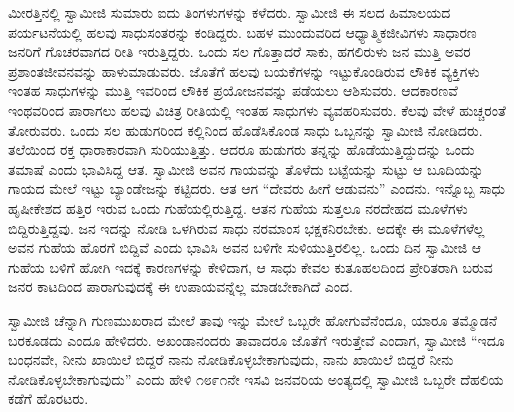 ಮೀರತ್ತಿನಲ್ಲಿ ಸ್ವಾಮೀಜಿ ಸುಮಾರು ಐದು ತಿಂಗಳುಗಳನ್ನು ಕಳೆದರು. ಸ್ವಾಮೀಜಿ ಈ ಸಲದ ಹಿಮಾಲಯದ ಪರ್ಯಟನೆಯಲ್ಲಿ ಹಲವು ಸಾಧುಸಂತರನ್ನು ಕಂಡಿದ್ದರು. ಬಹಳ ಮುಂದುವರಿದ ಆಧ್ಯಾತ್ಮಿಕಜೀವಿಗಳು ಸಾಧಾರಣ ಜನರಿಗೆ ಗೊಚರವಾಗದ ರೀತಿ ಇರುತ್ತಿದ್ದರು. ಒಂದು ಸಲ ಗೊತ್ತಾದರೆ ಸಾಕು, ಹಗಲಿರುಳು ಜನ ಮುತ್ತಿ ಅವರ ಪ್ರಶಾಂತಜೀವನವನ್ನು ಹಾಳುಮಾಡುವರು. ಜೊತೆಗೆ ಹಲವು ಬಯಕೆಗಳನ್ನು ಇಟ್ಟುಕೊಂಡಿರುವ ಲೌಕಿಕ ವ್ಯಕ್ತಿಗಳು ಇಂತಹ ಸಾಧುಗಳನ್ನು ಮುತ್ತಿ ಇವರಿಂದ ಲೌಕಿಕ ಪ್ರಯೋಜನವನ್ನು ಪಡೆಯಲು ಆಶಿಸುವರು. ಆದಕಾರಣವೆ ಇಂಥವರಿಂದ ಪಾರಾಗಲು ಹಲವು ವಿಚಿತ್ರ ರೀತಿಯಲ್ಲಿ ಇಂತಹ ಸಾಧುಗಳು ವ್ಯವಹರಿಸುವರು. ಕೆಲವು ವೇಳೆ ಹುಚ್ಚರಂತೆ ತೋರುವರು. ಒಂದು ಸಲ ಹುಡುಗರಿಂದ ಕಲ್ಲಿನಿಂದ ಹೊಡೆಸಿಕೊಂಡ ಸಾಧು ಒಬ್ಬನನ್ನು ಸ್ವಾಮೀಜಿ ನೋಡಿದರು. ತಲೆಯಿಂದ ರಕ್ತ ಧಾರಾಕಾರವಾಗಿ ಸುರಿಯುತ್ತಿತ್ತು. ಆದರೂ ಹುಡುಗರು ತನ್ನನ್ನು ಹೊಡೆಯುತ್ತಿದ್ದುದನ್ನು ಒಂದು ತಮಾಷೆ ಎಂದು ಭಾವಿಸಿದ್ದ ಆತ. ಸ್ವಾಮೀಜಿ ಅವನ ಗಾಯವನ್ನು ತೊಳೆದು ಬಟ್ಟೆಯನ್ನು ಸುಟ್ಟು ಆ ಬೂದಿಯನ್ನು ಗಾಯದ ಮೇಲೆ ಇಟ್ಟು ಬ್ಯಾಂಡೇಜನ್ನು ಕಟ್ಟಿದರು. ಆತ ಆಗ “ದೇವರು ಹೀಗೆ ಆಡುವನು” ಎಂದನು. ಇನ್ನೊಬ್ಬ ಸಾಧು ಹೃಷೀಕೇಶದ ಹತ್ತಿರ ಇರುವ ಒಂದು ಗುಹೆಯಲ್ಲಿರುತ್ತಿದ್ದ. ಆತನ ಗುಹೆಯ ಸುತ್ತಲೂ ನರದೇಹದ ಮೂಳೆಗಳು ಬಿದ್ದಿರುತ್ತಿದ್ದವು. ಜನ ಇದನ್ನು ನೋಡಿ ಒಳಗಿರುವ ಸಾಧು ನರಮಾಂಸ ಭಕ್ಷಕನಿರಬೇಕು. ಅದಕ್ಕೇ ಈ ಮೂಳೆಗಳೆಲ್ಲ ಅವನ ಗುಹೆಯ ಹೊರಗೆ ಬಿದ್ದಿವೆ ಎಂದು ಭಾವಿಸಿ ಅವನ ಬಳಿಗೇ ಸುಳಿಯುತ್ತಿರಲಿಲ್ಲ. ಒಂದು ದಿನ ಸ್ವಾಮೀಜಿ ಆ ಗುಹೆಯ ಬಳಿಗೆ ಹೋಗಿ ಇದಕ್ಕೆ ಕಾರಣಗಳನ್ನು ಕೇಳಿದಾಗ, ಆ ಸಾಧು ಕೇವಲ ಕುತೂಹಲದಿಂದ ಪ್ರೇರಿತರಾಗಿ ಬರುವ ಜನರ ಕಾಟದಿಂದ ಪಾರಾಗುವುದಕ್ಕೆ ಈ ಉಪಾಯವನ್ನೆಲ್ಲ ಮಾಡಬೇಕಾಗಿದೆ ಎಂದ. 

ಸ್ವಾಮೀಜಿ ಚೆನ್ನಾಗಿ ಗುಣಮುಖರಾದ ಮೇಲೆ ತಾವು ಇನ್ನು ಮೇಲೆ ಒಬ್ಬರೇ ಹೋಗುವೆನೆಂದೂ, ಯಾರೂ ತಮ್ಮೊಡನೆ ಬರಕೂಡದು ಎಂದೂ ಹೇಳಿದರು. ಅಖಂಡಾನಂದರು ತಾವಾದರೂ ಜೊತೆಗೆ ಇರುತ್ತೇವೆ ಎಂದಾಗ, ಸ್ವಾಮೀಜಿ “ಇದೂ ಬಂಧನವೇ, ನೀನು ಖಾಯಿಲೆ ಬಿದ್ದರೆ ನಾನು ನೋಡಿಕೊಳ್ಳಬೇಕಾಗುವುದು, ನಾನು ಖಾಯಿಲೆ ಬಿದ್ದರೆ ನೀನು ನೋಡಿಕೊಳ್ಳಬೇಕಾಗುವುದು” ಎಂದು ಹೇಳಿ ೧೮೯೧ನೇ ಇಸವಿ ಜನವರಿಯ ಅಂತ್ಯದಲ್ಲಿ ಸ್ವಾಮೀಜಿ ಒಬ್ಬರೇ ದೆಹಲಿಯ ಕಡೆಗೆ ಹೊರಟರು. 

